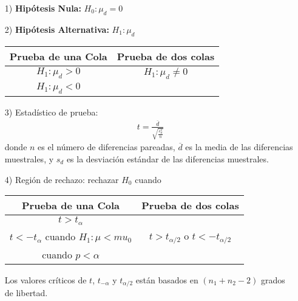 \begin{itemize}
\begin{itemize}
\item[1) ] \textbf{Hip\'otesis Nula:} $H_{0}:\mu_{d}=0$
\item[2) ] \textbf{Hip\'otesis Alternativa: } $H_{1}:\mu_{d}$
\begin{tabular}{cc}\hline
\textbf{Prueba de una Cola} & \textbf{Prueba de dos colas}\\\hline
$H_{1}:\mu_{d}>0$ & $H_{1}:\mu_{d}\neq 0$\\ 
$H_{1}:\mu_{d}<0$&\\
\end{tabular}
\item[3) ] Estad\'istico de prueba:
\begin{eqnarray*}
t=\frac{\overline{d}}{\sqrt{\frac{s_{d}^{2}}{n}}}
\end{eqnarray*}
donde $n$ es el n\'umero de diferencias pareadas, $\overline{d}$ es la media de las diferencias muestrales, y $s_{d}$ es la desviaci\'on est\'andar de las diferencias muestrales.
\item[4) ] Regi\'on de rechazo: rechazar $H_{0}$ cuando
\begin{tabular}{cc}\hline
\textbf{Prueba de una Cola} & \textbf{Prueba de dos colas}\\\hline
$t>t_{\alpha}$ & \\
$t<-t_{\alpha}$ cuando $H_{1}:\mu<mu_{0}$&$t>t_{\alpha/2}$ o $t<-t_{\alpha/2}$\\
 cuando $p<\alpha$&\\
\end{tabular}

Los valores cr\'iticos de $t$, $t_{-\alpha}$ y $t_{\alpha/2}$ est\'an basados en $\left(n_{1}+n_{2}-2\right)$ grados de libertad.
\end{itemize}

\end{itemize}

